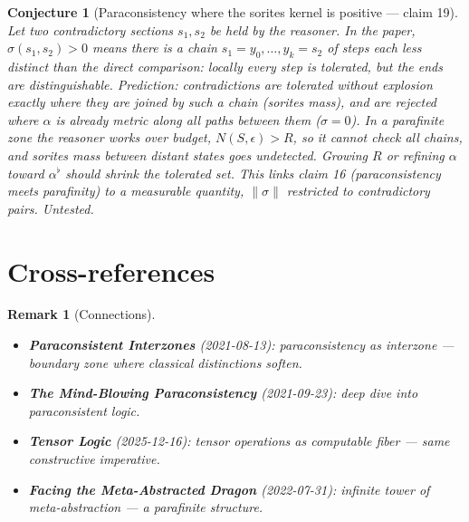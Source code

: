 \documentclass[11pt,a4paper]{article}
\newtheorem{remark}[definition]{Remark}
\newtheorem{conjecture}[definition]{Conjecture}
\begin{document}
\begin{conjecture}[Paraconsistency where the sorites kernel is positive --- claim 19]
\label{conj:subres}
Let two contradictory sections $s_1,s_2$ be held by the reasoner. In the paper,
$\sigma(s_1,s_2)>0$ means there is a chain $s_1=y_0,\dots,y_k=s_2$ of steps
each less distinct than the direct comparison: locally every step is
tolerated, but the ends are distinguishable. Prediction: contradictions are
tolerated without explosion exactly where they are joined by such a chain
(sorites mass), and are rejected where $\alpha$ is already metric along all
paths between them ($\sigma=0$). In a parafinite zone the reasoner works
over budget, $N(S,\epsilon)>R$, so it cannot check all chains, and sorites
mass between distant states goes undetected. Growing $R$ or refining $\alpha$
toward $\alpha^{\flat}$ should shrink the tolerated set. This links claim 16
(paraconsistency meets parafinity) to a measurable quantity, $\|\sigma\|$
restricted to contradictory pairs. Untested.
\end{conjecture}

\section{Cross-references}

\begin{remark}[Connections]
\begin{itemize}
\item \textbf{Paraconsistent Interzones} (2021-08-13): paraconsistency
  as interzone --- boundary zone where classical distinctions soften.
\item \textbf{The Mind-Blowing Paraconsistency} (2021-09-23): deep dive
  into paraconsistent logic.
\item \textbf{Tensor Logic} (2025-12-16): tensor operations as
  computable fiber --- same constructive imperative.
\item \textbf{Facing the Meta-Abstracted Dragon} (2022-07-31): infinite
  tower of meta-abstraction --- a parafinite structure.
\end{itemize}
\end{remark}
\end{document}
